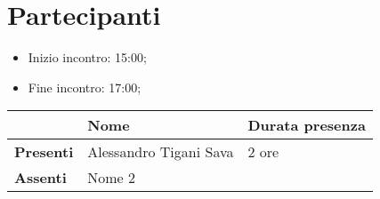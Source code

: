 \section{Partecipanti}

\begin{itemize}
    \item Inizio incontro: 15:00;
    \item Fine incontro: 17:00;
\end{itemize}


\begin{center}
	{\renewcommand{\arraystretch}{1.5}
	\begin{tabular}{l|ll}
							& \textbf{Nome}  & \textbf{Durata presenza} \\
		\hline
		\textbf{Presenti}   & Alessandro Tigani Sava 	& 2 ore     \\
		\textbf{Assenti}	& Nome 2            &      		\\
	\end{tabular}	
	}
	\end{center}